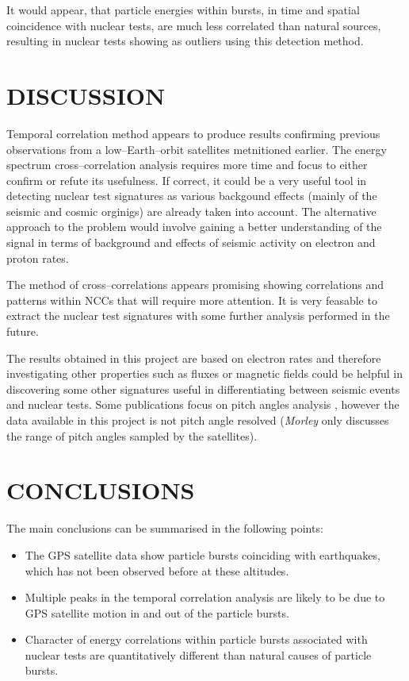 \documentclass[twocolumn,prl,nobalancelastpage,aps,10pt,floatfix]{revtex4-1}
\begin{document}
It would appear, that particle energies within bursts, in time and spatial coincidence with nuclear tests, are much less correlated than natural sources, resulting in nuclear tests showing as outliers using this detection method.

\section{DISCUSSION} 

Temporal correlation method appears to produce results confirming previous observations from a low--Earth--orbit satellites metnitioned earlier. The energy spectrum cross--correlation analysis requires more time and focus to either confirm or refute its usefulness. If correct, it could be a very useful tool in detecting nuclear test signatures as various backgound effects (mainly of the seismic and cosmic orginigs) are already taken into account. The alternative approach to the problem would involve gaining a better understanding of the signal in terms of background and effects of seismic activity on electron and proton rates.

The method of cross--correlations appears promising showing correlations and patterns within NCCs that will require more attention. It is very feasable to extract the nuclear test signatures with some further analysis performed in the future.

The results obtained in this project are based on electron rates and therefore investigating other properties such as fluxes or magnetic fields could be helpful in discovering some other signatures useful in differentiating between seismic events and nuclear tests. Some publications focus on pitch angles analysis \cite{dem}, however the data available in this project is not pitch angle resolved \cite{cay1}\cite{cay2} (\textit{Morley} only discusses the range of pitch angles sampled by the satellites).
 
 
\section{CONCLUSIONS} 
The main conclusions can be summarised in the following points:
\begin{itemize}
	\item The GPS satellite data show particle bursts coinciding with earthquakes, which has not been observed before at these altitudes.
	\item Multiple peaks in the temporal correlation analysis are likely to be due to GPS satellite motion in and out of the particle bursts.
	\item Character of energy correlations within particle bursts associated with nuclear tests are quantitatively different than natural causes of particle bursts.
\end{itemize}
  
\end{document}
